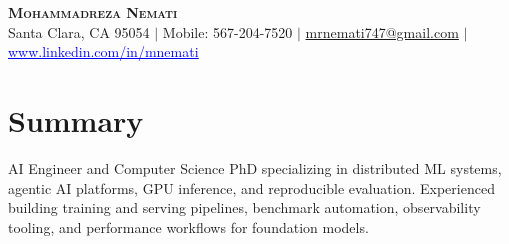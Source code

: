\documentclass[letterpaper,13pt]{article}
\begin{document}
\begin{center}
    \textbf{\LARGE \scshape Mohammadreza Nemati} \\ \vspace{1pt}
    \small Santa Clara, CA 95054 $|$ Mobile: 567-204-7520 $|$
    \href{mailto:mrnemati747@gmail.com}{mrnemati747@gmail.com} $|$
    \href{https://www.linkedin.com/in/mnemati/}{\textcolor{blue}{\underline{www.linkedin.com/in/mnemati}}}
\end{center}

\section{Summary}
\small{AI Engineer and Computer Science PhD specializing in distributed ML systems, agentic AI platforms, GPU inference, and reproducible evaluation. Experienced building training and serving pipelines, benchmark automation, observability tooling, and performance workflows for foundation models.}
\vspace{0.05cm}
\end{document}
